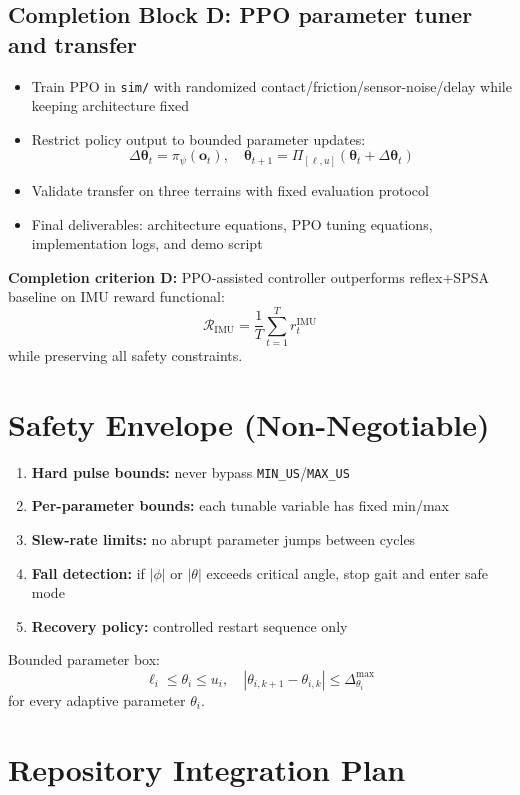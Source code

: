 \documentclass[11pt]{article}
\begin{document}
\subsection*{Completion Block D: PPO parameter tuner and transfer}
\begin{itemize}
    \item Train PPO in \texttt{sim/} with randomized contact/friction/sensor-noise/delay while keeping architecture fixed
    \item Restrict policy output to bounded parameter updates:
    \[
    \Delta\boldsymbol{\theta}_t=\pi_{\psi}(\mathbf{o}_t),\quad
    \boldsymbol{\theta}_{t+1}=\Pi_{[\ell,u]}(\boldsymbol{\theta}_{t}+\Delta\boldsymbol{\theta}_t)
    \]
    \item Validate transfer on three terrains with fixed evaluation protocol
    \item Final deliverables: architecture equations, PPO tuning equations, implementation logs, and demo script
\end{itemize}
\textbf{Completion criterion D:} PPO-assisted controller outperforms reflex+SPSA baseline on IMU reward functional:
\[
\mathcal{R}_{\mathrm{IMU}}=\frac{1}{T}\sum_{t=1}^{T} r_t^{\mathrm{IMU}}
\]
while preserving all safety constraints.

\section{Safety Envelope (Non-Negotiable)}

\begin{enumerate}
    \item \textbf{Hard pulse bounds:} never bypass \texttt{MIN\_US}/\texttt{MAX\_US}
    \item \textbf{Per-parameter bounds:} each tunable variable has fixed min/max
    \item \textbf{Slew-rate limits:} no abrupt parameter jumps between cycles
    \item \textbf{Fall detection:} if $|\phi|$ or $|\theta|$ exceeds critical angle, stop gait and enter safe mode
    \item \textbf{Recovery policy:} controlled restart sequence only
\end{enumerate}

Bounded parameter box:
\[
\ell_i \le \theta_i \le u_i,\quad
|\theta_{i,k+1}-\theta_{i,k}|\le \Delta^{\max}_{\theta_i}
\]
for every adaptive parameter $\theta_i$.

\section{Repository Integration Plan}
\end{document}
